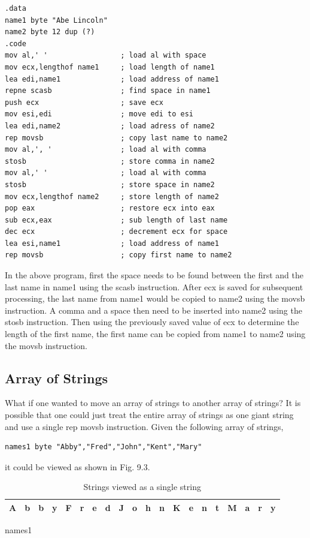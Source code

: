 \documentclass[10pt]{book}
\begin{document}
\begin{verbatim}
.data
name1 byte "Abe Lincoln"
name2 byte 12 dup (?)
.code
mov al,' '                 ; load al with space
mov ecx,lengthof name1     ; load length of name1
lea edi,name1              ; load address of name1
repne scasb                ; find space in name1
push ecx                   ; save ecx
mov esi,edi                ; move edi to esi
lea edi,name2              ; load adress of name2
rep movsb                  ; copy last name to name2
mov al,', '                ; load al with comma
stosb                      ; store comma in name2
mov al,' '                 ; load al with comma
stosb                      ; store space in name2
mov ecx,lengthof name2     ; store length of name2
pop eax                    ; restore ecx into eax
sub ecx,eax                ; sub length of last name
dec ecx                    ; decrement ecx for space
lea esi,name1              ; load address of name1
rep movsb                  ; copy first name to name2
\end{verbatim}

In the above program, first the space needs to be found between the first and the last name in name1 using the scasb instruction. After ecx is saved for subsequent processing, the last name from name1 would be copied to name2 using the movsb instruction. A comma and a space then need to be inserted into name2 using the stosb instruction. Then using the previously saved value of ecx to determine the length of the first name, the first name can be copied from name1 to name2 using the movsb instruction.

\subsection{Array of Strings}
What if one wanted to move an array of strings to another array of strings? It is possible that one could just treat the entire array of strings as one giant string and use a single rep movsb instruction. Given the following array of strings,

\begin{verbatim}
names1 byte "Abby","Fred","John","Kent","Mary"
\end{verbatim}

it could be viewed as shown in Fig. 9.3.

\begin{table}[!htbp]
\centering
\caption{Strings viewed as a single string}
\begin{tabular}{|l|l|l|l|l|l|l|l|l|l|l|l|l|l|l|l|l|l|l|l|}
\hline
A & b & b & y & F & r & e & d & J & o & h & n & K & e & n & t & M & a & r & y \\
\hline
\end{tabular}
\end{table}
names1
\end{document}
